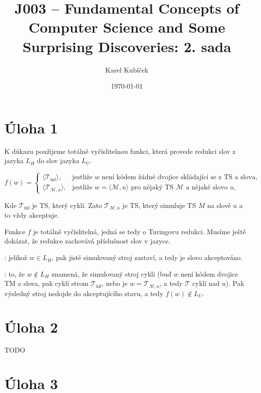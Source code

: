 \documentclass[a4paper]{article}
\title{J003 -- Fundamental Concepts of Computer Science and Some Surprising Discoveries: 2. sada}
\author{Karel Kubíček}
\date{\today}
\begin{document}
\maketitle

\section*{Úloha 1}
K důkazu použijeme totálně vyčíslitelnou funkci, která provede redukci slov z jazyka $L_{H}$ do slov jazyka $L_{U}$.

\[
    f(w) = 
    \begin{cases}
        \langle \mathcal{T}_{\mathrm{inf}} \rangle, & \text{jestliže } w \text{ není kódem žádné dvojice skládající se z TS a slova, } \\
        \langle \mathcal{T}_{\mathcal{M}, u} \rangle, & \text{jestliže } w = \langle \mathcal{M}, u \rangle \text{ pro nějaký TS } \mathcal{M} \text{ a nějaké slovo } u,
    \end{cases}
\]

Kde $\mathcal{T}_{\mathrm{inf}}$ je TS, který cyklí. Zato $\mathcal{T}_{\mathcal{M}, u}$ je TS, který simuluje TS $M$ na slově $u$ a to vždy akceptuje.

Funkce $f$ je totálně vyčíslitelná, jedná se tedy o Turingovu redukci. Musíme ještě dokázat, že redukce zachovává příslušnost slov v jazyce.

: jelikož $w \in L_{H}$, pak jistě simulovaný stroj zastaví, a tedy je slovo akceptováno.

: to, že $w \not \in L_{H}$ znamená, že simulovaný stroj cyklí (buď $w$ není kódem dvojice TM a slova, pak cyklí strom $\mathcal{T}_{\mathrm{inf}}$, nebo je $w = \mathcal{T}_{\mathcal{M}, u}$, a tedy $\mathcal{T}$ cyklí nad $u$). Pak výsledný stroj nedojde do akceptujícího stavu, a tedy $f(w) \not\in L_{U}$.

\section*{Úloha 2}

TODO

\section*{Úloha 3}
\end{document}

